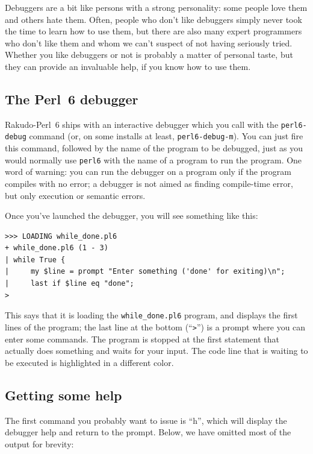 Debuggers are a bit like persons with a strong personality: 
some people love them and others hate them. Often, people 
who don't like debuggers simply never took the time to learn 
how to use them, but there are also many expert programmers 
who don't like them and whom we can't suspect of not having 
seriously tried. Whether you like debuggers or not is 
probably a matter of personal taste, but they can provide an 
invaluable help, if you know how to use them.

\subsection{The Perl~6 debugger}

Rakudo-Perl~6 ships with an interactive debugger which 
you call with the {\tt perl6-debug} command (or, on 
some installs at least, {\tt perl6-debug-m}). You can 
just fire this command, followed by the name of the program 
to be debugged, just as you would normally use {\tt perl6} with 
the name of a program to run the program. One word of 
warning: you can run the debugger on a program only if 
the program compiles with no error; a debugger is not 
aimed as finding compile-time error, but only execution 
or semantic errors.

Once you've launched the debugger, you will see something 
like this:

\begin{verbatim}
>>> LOADING while_done.pl6
+ while_done.pl6 (1 - 3)
| while True {
|     my $line = prompt "Enter something ('done' for exiting)\n";
|     last if $line eq "done";
>
\end{verbatim}

This says that it is loading the \verb'while_done.pl6' program, 
and displays the first lines of the program; the last line at 
the bottom (``\verb">"'') is a prompt where you can enter some 
commands. The program 
is stopped at the first statement that actually does something 
and waits for your input. The code line that is waiting to be 
executed is highlighted in a different color.

\subsection{Getting some help}

The first command you probably want to issue is ``h'', which 
will display the debugger help and return to the prompt. 
Below, we have omitted most of the output for brevity:

